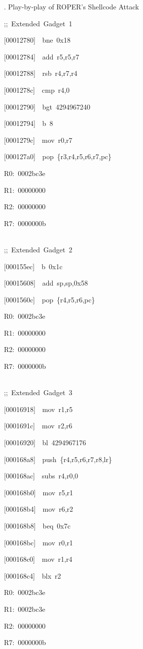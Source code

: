 \documentclass[9pt]{beamer}
\newcommand{\Gap} { \\ \ \vspace{8pt} }
\begin{document}
\begin{frame}{\theframenumber. Play-by-play of ROPER's Shellcode Attack}
  \begin{multicols}{3}
  \tiny
  {\color{title};;~Extended~Gadget~1}
  
  [00012780]~~bne~0x18
  
  [00012784]~~add~r5,r5,r7

  [00012788]~~rsb~r4,r7,r4

  [0001278c]~~cmp~r4,0
  
  [00012790]~~bgt~4294967240
  
  [00012794]~~b~8
  
  [0001279c]~~mov~r0,r7
  
  [000127a0]~~pop~\{r3,r4,r5,r6,r7,pc\}
  \vspace{4pt}


  R0:~0002bc3e

  R1:~00000000
  
  R2:~00000000
  
  R7:~0000000b
  \Gap

  \columnbreak
  {\color{title};;~Extended~Gadget~2}
  
  [000155ec]~~b~0x1c

  [00015608]~~add~sp,sp,0x58

  [0001560c]~~pop~\{r4,r5,r6,pc\}
  \vspace{4pt}
  
  R0:~0002bc3e
  
  R1:~00000000
  
  R2:~00000000
  
  R7:~0000000b
  \Gap
\columnbreak

{\color{title};;~Extended~Gadget~3}
  
\alert{[00016918]~~mov~r1,r5}

[0001691c]~~mov~r2,r6

[00016920]~~bl~4294967176

[000168a8]~~push~\{r4,r5,r6,r7,r8,lr\}

[000168ac]~~subs~r4,r0,0

[000168b0]~~mov~r5,r1

[000168b4]~~mov~r6,r2

[000168b8]~~beq~0x7c

[000168bc]~~mov~r0,r1

[000168c0]~~mov~r1,r4

\alert{[000168c4]~~blx~r2}
\vspace{4pt}


R0:~0002bc3e

R1:~0002bc3e

R2:~00000000

R7:~0000000b

\end{multicols}
\end{frame}
\end{document}
